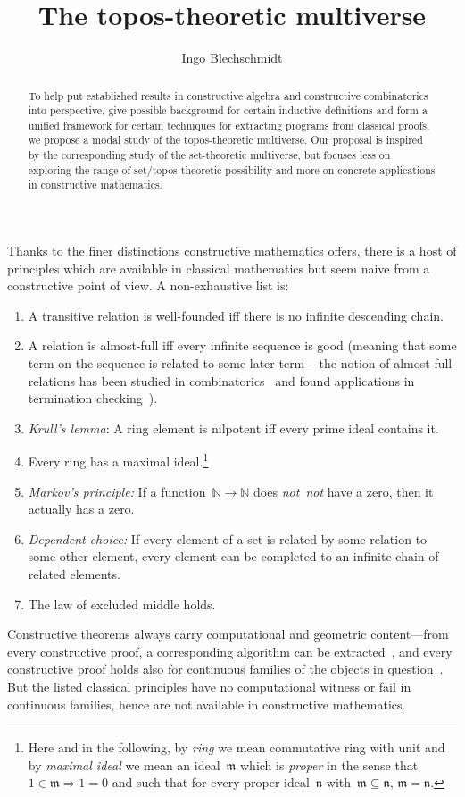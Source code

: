 \documentclass[oneside,reqno]{amsart}
\title{The topos-theoretic multiverse}
\author{Ingo Blechschmidt}
\theoremstyle{definition}
\theoremstyle{plain}
\theoremstyle{remark}
\newcommand{\mmm}{\mathfrak{m}}
\newcommand{\nnn}{\mathfrak{n}}
\newcommand{\NN}{\mathbb{N}}
\renewcommand{\_}{\mathpunct{.}\,}
\newcommand{\notnot}{\emph{not~not}\xspace}
\newcommand{\?}{\,{:}\,}
\begin{document}
\begin{abstract}
  To help put established results in constructive algebra and constructive
  combinatorics into perspective, give possible background for certain
  inductive definitions and form a unified framework for certain techniques for
  extracting programs from classical proofs, we propose a modal study of the
  topos-theoretic multiverse. Our proposal is inspired by the corresponding study
  of the set-theoretic multiverse, but focuses less on exploring the range of
  set/topos-theoretic possibility and more on concrete applications in
  constructive mathematics.
\end{abstract}

\maketitle
\thispagestyle{empty}

\noindent
Thanks to the finer distinctions constructive mathematics offers, there is a
host of principles which are available in classical mathematics but seem naive
from a constructive point of view. A non-exhaustive list is:
\begin{enumerate}
\renewcommand{\theenumi}{\arabic{enumi}*}
\item A transitive relation is well-founded iff there is no infinite descending
chain.
\item A relation is almost-full iff every infinite sequence is good (meaning
that some term on the sequence is related to some later term -- the notion
of almost-full relations
has been studied in combinatorics~\cite{xxx} and found applications in
termination checking~\cite{xxx}).
\item \emph{Krull's lemma}: A ring element is nilpotent iff every prime
ideal contains it.
\item Every ring has a maximal ideal.\footnote{Here and in the following, by
\emph{ring} we mean commutative ring with unit and by \emph{maximal ideal} we
mean an ideal~$\mmm$ which is \emph{proper} in the sense that~$1 \in \mmm
\Rightarrow 1 = 0$ and such that for every proper ideal~$\nnn$ with~$\mmm
\subseteq \nnn$, $\mmm = \nnn$.}
\item \emph{Markov's principle:} If a function~$\NN \to \NN$ does \notnot have
a zero, then it actually has a zero.
\item \emph{Dependent choice:} If every element of a set is related by some relation to some other
element, every element can be completed to an infinite chain of related
elements.
\item The law of excluded middle holds.
\end{enumerate}
Constructive theorems always carry computational and geometric
content---from every constructive proof, a corresponding algorithm can be
extracted~\cite{bauer:c2c}, and every constructive proof holds also for continuous families of
the objects in question~\cite[Section~4.3]{blechschmidt:filmat}. But the listed classical principles have no
computational witness or fail in continuous families, hence are not
available in constructive mathematics.
\end{document}
